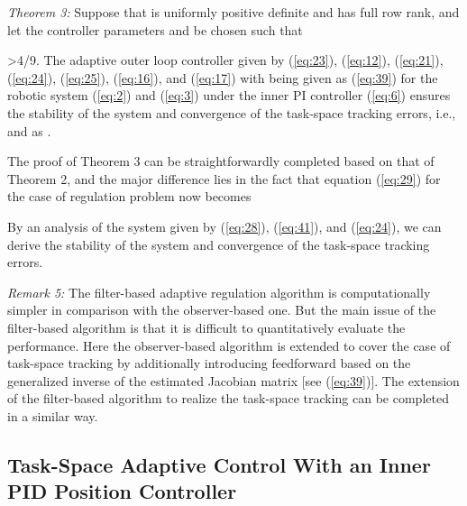 \documentclass[9pt,technote]{IEEEtran}
\def \be {}
\begin{document}
\emph{Theorem 3:} Suppose that  is uniformly positive definite and  has full row rank, and let the controller parameters  and  be chosen such that
\be
\beta>4\gamma/9.
\ee
The adaptive outer loop controller given by (\ref{eq:23}), (\ref{eq:12}), (\ref{eq:21}), (\ref{eq:24}), (\ref{eq:25}), (\ref{eq:16}), and (\ref{eq:17}) with  being given as (\ref{eq:39}) for the robotic system (\ref{eq:2}) and (\ref{eq:3}) under the inner PI controller (\ref{eq:6}) ensures the stability of the system and convergence of the task-space tracking errors, i.e.,  and  as .

The proof of Theorem 3 can be straightforwardly completed based on that of Theorem 2, and the major difference lies in the fact that equation (\ref{eq:29}) for the case of regulation problem now becomes

By an analysis of the system given by (\ref{eq:28}), (\ref{eq:41}), and (\ref{eq:24}), we can derive the stability of the system and convergence of the task-space tracking errors.


\emph{Remark 5:} The filter-based adaptive regulation algorithm is computationally simpler in comparison with the observer-based one. But the main issue of the filter-based algorithm is that it is difficult to quantitatively evaluate the performance. Here the observer-based algorithm is extended to cover the case of task-space tracking by additionally introducing feedforward based on the generalized inverse of the estimated Jacobian matrix [see (\ref{eq:39})]. The extension of the filter-based algorithm to realize the task-space tracking can be completed in a similar way.

\subsection{Task-Space Adaptive Control With an Inner PID Position Controller}
\end{document}
